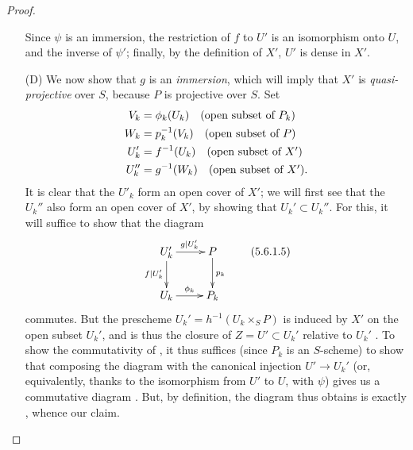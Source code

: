 \begin{proof}
\begin{enumerate}
    Since $\psi$ is an immersion, the restriction of $f$ to $U'$ is an isomorphism onto $U$, and the inverse of $\psi'$; finally, by the definition of $X'$, $U'$ is dense in $X'$.
  \item[(D)] We now show that $g$ is an \emph{immersion}, which will imply that $X'$ is \emph{quasi-projective} over $S$, because $P$ is projective over $S$.
    Set
    \begin{align*}
      V_k  &=\phi_k(U_k) \quad\mbox{(open subset of $P_k$)}\\
      W_k  &=p_k^{-1}(V_k)\quad\mbox{(open subset of $P$)}\\
      U_k' &=f^{-1}(U_k)  \quad\mbox{(open subset of $X'$)}\\
      U_k''&=g^{-1}(W_k)  \quad\mbox{(open subset of $X'$)}.
    \end{align*}
    It is clear that the $U'_k$ form an open cover of $X'$; we will first see that the $U_k''$ also form an open cover of $X'$, by showing that $U_k'\subset U_k''$.
    For this, it will suffice to show that the diagram
    \[
    \label{II.5.6.1.5}
      \xymatrix{
        U_k'\ar[r]^{g|U_k'}\ar[d]_{f|U_k'} &
        P\ar[d]^{p_k}\\
        U_k\ar[r]^{\vphi_k} &
        P_k
      }
      \tag{5.6.1.5}
    \]
    commutes.
    But the prescheme $U_k'=h^{-1}(U_k\times_S P)$ is induced by $X'$ on the open subset $U_k'$, and is thus the closure of $Z=U'\subset U_k'$ relative to $U_k'$ .
    To show the commutativity of , it thus suffices (since $P_k$ is an $S$-scheme) to show that composing the diagram with the canonical injection $U'\to U_k'$ (or, equivalently, thanks to the isomorphism from $U'$ to $U$, with $\psi$) gives us a commutative diagram .
    But, by definition, the diagram thus obtains is exactly , whence our claim.


\end{enumerate}
\end{proof}
